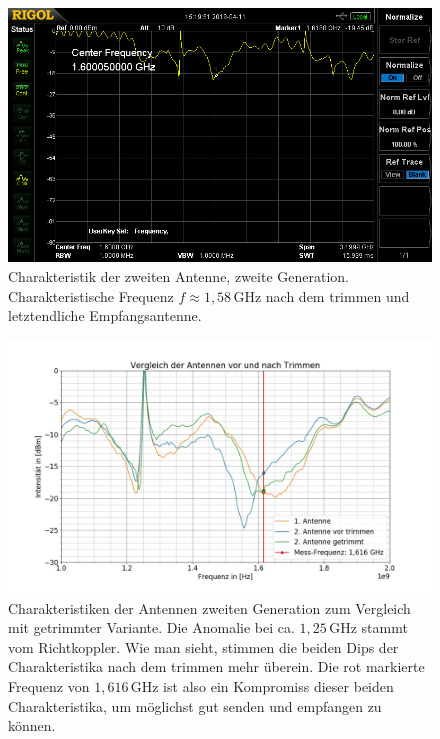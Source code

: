 \documentclass[titlepage,11pt,a4paper,ngerman]{article}
\begin{document}
\begin{figure}[ht]
	\includegraphics[scale=0.075]{Bilder/anttrimm2.jpg}
	\centering
	\caption{Charakteristik der zweiten Antenne, zweite Generation. Charakteristische Frequenz $f\approx1{,}58\,$GHz nach dem trimmen und letztendliche Empfangsantenne.}
	\label{Ant2-getrimmt}
\end{figure}

\begin{figure}[ht]
	\includegraphics[scale=0.4]{Bilder/Antennentrimmen}
	\centering
	\caption{Charakteristiken der Antennen zweiten Generation zum Vergleich mit getrimmter Variante. Die Anomalie bei ca. $ 1{,}25 \, $GHz stammt vom Richtkoppler. Wie man sieht, stimmen die beiden Dips der Charakteristika nach dem trimmen mehr überein. Die rot markierte Frequenz von $ 1{,}616 \, $GHz ist also ein Kompromiss dieser beiden Charakteristika, um möglichst gut senden und empfangen zu können.}
	\label{Vergleich}
\end{figure}
\end{document}
